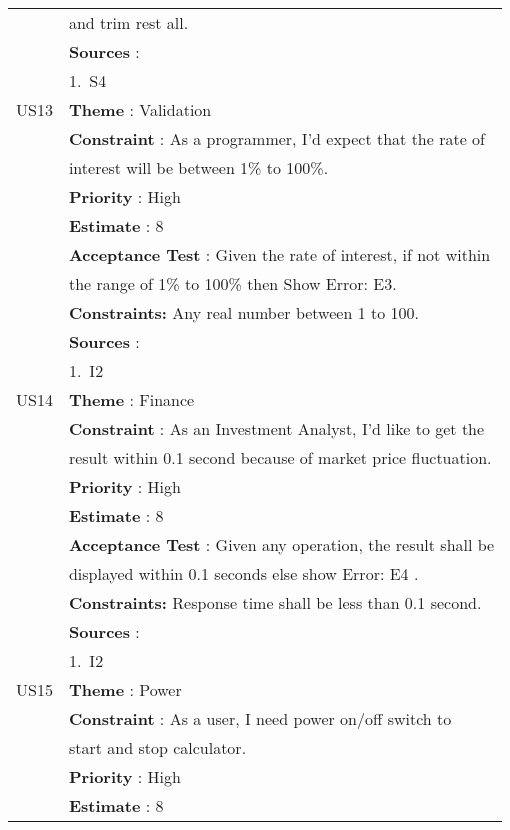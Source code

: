 \documentclass{article}
\begin{document}
\begin{longtable}{|| c || l ||}
         & and trim rest all. \\
         & \textbf{Sources} : \\
         & 1.~S4 \\
         \hline
         \newpage
         \hline
         US13 & \textbf{Theme} : Validation \\
         & \textbf{Constraint} : As a programmer, I'd expect that the rate of \\ 
         & interest will be between 1\% to 100\%.\\ 
         & \textbf{Priority} : High \\
         & \textbf{Estimate} : 8 \\
         & \textbf{Acceptance Test} : Given the rate of interest, if not within \\ 
         & the range of 1\% to 100\% then Show Error: E3. \\
         & \textbf{Constraints: } Any real number between 1 to 100.\\
         & \textbf{Sources} : \\
         & 1.~I2 \\
         \hline
         US14 & \textbf{Theme} : Finance \\
         & \textbf{Constraint} : As an Investment Analyst, I'd like to get the \\ 
         & result within 0.1 second because of market price fluctuation.\\ 
         & \textbf{Priority} : High \\
         & \textbf{Estimate} : 8 \\
         & \textbf{Acceptance Test} : Given any operation, the result shall be \\ 
         & displayed within 0.1 seconds else show Error: E4 . \\
         & \textbf{Constraints: } Response time shall be less than 0.1 second.\\
         & \textbf{Sources} : \\
         & 1.~I2 \\
         \hline
         US15 & \textbf{Theme} : Power \\
         & \textbf{Constraint} : As a user, I need power on/off switch to \\ 
         & start and stop calculator.\\
         & \textbf{Priority} : High \\
         & \textbf{Estimate} : 8 \\

\end{longtable}
\end{document}
